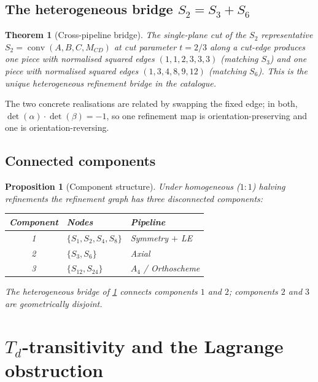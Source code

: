 \documentclass[11pt,a4paper]{article}
\theoremstyle{plain}
\newtheorem{theorem}{Theorem}[section]
\newtheorem{proposition}[proposition]{Proposition}
\theoremstyle{definition}
\theoremstyle{remark}
\DeclareMathOperator{\conv}{conv}
\newcommand{\Td}{T_{\!d}}
\begin{document}
\subsection{The heterogeneous bridge \texorpdfstring{$S_{2} = S_{3} + S_{6}$}{S2 = S3 + S6}}

\begin{theorem}[Cross-pipeline bridge]\label{thm:s2-bridge}
The single-plane cut of the $S_{2}$ representative
$S_{2} = \conv(A, B, C, M_{CD})$ at cut parameter $t = 2/3$ along a cut-edge
produces one piece with normalised squared edges $(1,1,2,3,3,3)$
(matching $S_{3}$) and one piece with normalised squared edges
$(1,3,4,8,9,12)$ (matching $S_{6}$).  This is the unique heterogeneous
refinement bridge in the catalogue.
\end{theorem}

The two concrete realisations are related by swapping the fixed edge; in
both, $\det(\alpha) \cdot \det(\beta) = -1$, so one refinement map is
orientation-preserving and one is orientation-reversing.

\subsection{Connected components}

\begin{proposition}[Component structure]\label{prop:components}
Under homogeneous ($1{:}1$) halving refinements the refinement graph has
\emph{three} disconnected components:
\begin{center}
\begin{tabular}{@{}cll@{}}
\toprule
Component & Nodes                               & Pipeline \\
\midrule
1 & $\{S_{1}, S_{2}, S_{4}, S_{8}\}$            & Symmetry $+$ LE \\
2 & $\{S_{3}, S_{6}\}$                          & Axial \\
3 & $\{S_{12}, S_{24}\}$                        & $A_{4}$ / Orthoscheme \\
\bottomrule
\end{tabular}
\end{center}
The heterogeneous bridge of \cref{thm:s2-bridge} connects components $1$
and $2$; components $2$ and $3$ are geometrically disjoint.
\end{proposition}

\section{\texorpdfstring{$\Td$}{Td}-transitivity and the Lagrange obstruction}
\label{sec:transitivity}
\end{document}
